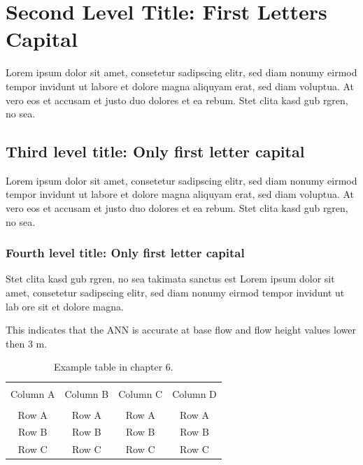 \section{Second Level Title: First Letters Capital}

Lorem ipsum dolor sit amet, consetetur sadipscing elitr, sed diam nonumy eirmod tempor invidunt ut labore et dolore magna aliquyam erat, sed diam voluptua. At vero eos et accusam et justo duo dolores et ea rebum. Stet clita kasd gub rgren, no sea.

\subsection{Third level title: Only first letter capital}

Lorem ipsum dolor sit amet, consetetur sadipscing elitr, sed diam nonumy eirmod tempor invidunt ut labore et dolore magna aliquyam erat, sed diam voluptua. At vero eos et accusam et justo duo dolores et ea rebum. Stet clita kasd gub rgren, no sea.

\subsubsection{Fourth level title: Only first letter capital}

Stet clita kasd gub rgren, no sea takimata sanctus est Lorem ipsum dolor sit amet, consetetur sadipscing elitr, sed diam nonumy eirmod tempor invidunt ut lab ore sit et dolore magna.

This indicates that the ANN is accurate at base flow and flow height values lower then 3 m. 

\begin{table}[!htbp]
	{\setlength{\tabcolsep}{14pt}
		\caption{Example table in chapter 6.}
		\begin{center}
			\vspace{-6mm}
			\begin{tabular}{cccc}
				\hline \\[-2.45ex] \hline \\[-2.1ex]
				Column A & Column B & Column C & Column D \\
				\hline \\[-1.8ex]
				Row A & Row A & Row A & Row A \\
				Row B & Row B & Row B & Row B \\
				Row C & Row C & Row C & Row C \\
				[-0ex] \hline
			\end{tabular}
			\vspace{-6mm}
		\end{center}
		\label{Table6.1}}
\end{table}

